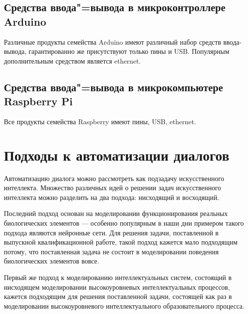 \subsection{Средства ввода"=вывода в микроконтроллере Arduino}
Различные продукты семейства Arduino имеют различный набор средств ввода-вывода, гарантированно же присутствуют только пины и USB. Популярным дополнительным средством является ethernet.

\subsection{Средства ввода"=вывода в микрокомпьютере Raspberry Pi}
Все продукты семейства Raspberry имеют пины, USB, ethernet.







\section{Подходы к автоматизации диалогов}
Автоматизацию диалога можно рассмотреть как подзадачу искусственного интеллекта. Множество различных идей о решении задач искусственного интеллекта можно разделить на два подхода: нисходящий и восходящий.

Последний подход основан на моделировании функционирования реальных биологических элементов --- особенно популярным в наши дни примером такого подхода являются нейронные сети. Для решения задачи, поставленной в выпускной квалификационной работе, такой подход кажется мало подходящим потому, что поставленная задача не состоит в моделировании поведения биологических элементов вовсе.

Первый же подход к моделированию интеллектуальных систем, состоящий в нисходящем моделировании высокоуровневых интеллектуальных процессов, кажется подходящим для решения поставленной задачи, состоящей как раз в моделировании высокоуровневого интеллектуального образовательного процесса. 

